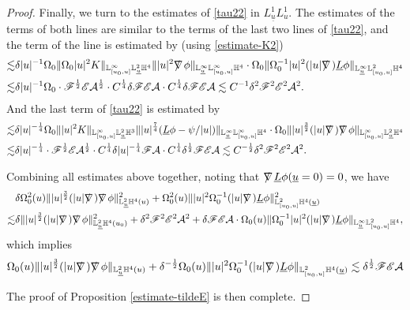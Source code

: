 \documentclass[11pt,reqno]{amsart}
\theoremstyle{definition}
\numberwithin{equation}{section}
\renewcommand{\L}{\mathbb{L}}
\renewcommand{\H}{\mathbb{H}}
\def\Lb{\underline{L}}
\def\ub{\underline{u}}
\def\nablas{\mbox{$\nabla \mkern -13mu /$ }}
\begin{document}
\begin{proof}
Finally, we turn to the estimates of \eqref{tau22} in $L^1_{\ub}L^1_u$. The estimates of the  terms of both lines are similar to the  terms of the last two lines of \eqref{tau22}, and the  term of the  line is estimated by (using \eqref{estimate-K2})
\begin{align*}
\lesssim&\delta|u|^{-1}\Omega_0\|\Omega_0|u|^2K\|_{\L^\infty_{[u_0,u]}\L^2_{\ub}\H^4}\||u|^2\nablas\phi\|_{\L^\infty_{\ub}\L^\infty_{[u_0,u]}\H^4}\cdot\Omega_0\|\Omega_0^{-1}|u|^2(|u|\nablas)\Lb\phi\|_{\L^\infty_{\ub}\L^2_{[u_0,u]}\H^4}\\
\lesssim&\delta|u|^{-1}\Omega_0\cdot \mathscr{F}^{\frac{1}{2}}\mathscr{E}\mathcal{A}^{\frac{1}{2}}\cdot C^{\frac{1}{4}}\delta\mathscr{F}\mathscr{E}\mathcal{A}\cdot C^{\frac{1}{4}}\delta\mathscr{F}\mathscr{E}\mathcal{A}\lesssim C^{-1}\delta^2\mathscr{F}^2\mathscr{E}^2\mathcal{A}^2.
\end{align*}
And the last term of \eqref{tau22} is estimated by
\begin{align*}
\lesssim&\delta|u|^{-\frac{1}{4}}\Omega_0\||u|^2K\|_{\L^\infty_{[u_0,u]}\L^2_{\ub}\H^3}\||u|^\frac{7}{4}(\Lb\phi-\psi/|u|)\|_{\L^\infty_{\ub}\L^\infty_{[u_0,u]}\H^4}\cdot\Omega_0\||u|^{\frac{3}{2}}(|u|\nablas)\nablas\phi\|_{\L^\infty_{[u_0,u]}\L^2_{\ub}\H^4}\\
\lesssim&\delta|u|^{-\frac{1}{4}}\cdot\mathscr{F}^{\frac{1}{2}}\mathscr{E}\mathcal{A}^{\frac{1}{2}}\cdot C^{\frac{1}{4}}\delta|u|^{-\frac{1}{4}}\mathscr{F}\mathcal{A}\cdot C^{\frac{1}{4}}\delta^{\frac{1}{2}}\mathscr{F}\mathscr{E}\mathcal{A}\lesssim C^{-\frac{1}{2}}\delta^2\mathscr{F}^2\mathscr{E}^2\mathcal{A}^2.
\end{align*}

Combining all estimates above together, noting that $\nablas\Lb\phi(\ub=0)=0$, we have
\begin{equation*}
\begin{split}
&\delta\Omega_0^2(u)\||u|^{\frac{3}{2}}(|u|\nablas)\nablas\phi\|_{\L^2_{\ub}\H^4(u)}^2+\Omega_0^2(u)\||u|^{2}\Omega_0^{-1}(|u|\nablas)\Lb\phi\|_{\L^2_{[u_0,u]}\H^4(\ub)}^2\\
\lesssim&\delta\||u|^{\frac{3}{2}}(|u|\nablas)\nablas\phi\|_{\L^2_{\ub}\H^4(u_0)}^2+\delta^2\mathscr{F}^2\mathscr{E}^2\mathcal{A}^2+\delta\mathscr{F}\mathscr{E}\mathcal{A}\cdot\Omega_0(u)\|\Omega_0^{-1}|u|^2(|u|\nablas)\Lb\phi\|_{\L^\infty_{\ub}\L^2_{[u_0,u]}\H^4},
\end{split}
\end{equation*}
which implies
\begin{equation}\label{estimate-nablas5nablasphi}
\begin{split}
\Omega_0(u)\||u|^{\frac{3}{2}}(|u|\nablas)\nablas\phi\|_{\L^2_{\ub}\H^4(u)}+\delta^{-\frac{1}{2}}\Omega_0(u)\||u|^{2}\Omega_0^{-1}(|u|\nablas)\Lb\phi\|_{\L^2_{[u_0,u]}\H^4(\ub)}\lesssim\delta^{\frac{1}{2}}\mathscr{F}\mathscr{E}\mathcal{A}
\end{split}
\end{equation}

The proof of Proposition \ref{estimate-tildeE} is then complete.\end{proof}
\end{document}
